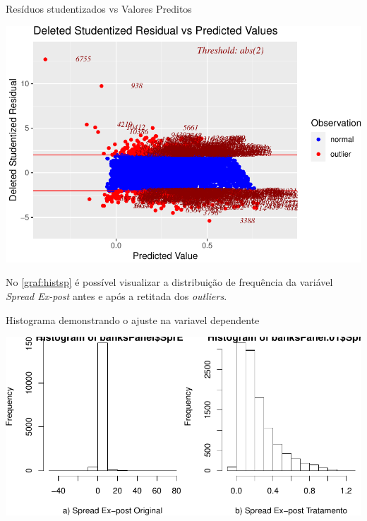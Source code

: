 \documentclass[
  12pt,
  12pt,
  openright,
  oneside,
  a4paper,
  chapter=TITLE,
  section=TITLE,
  subsection=TITLE,
  subsubsection=TITLE,
  english,
  portugues,
  sumario=tradicional]{abntex2}
\begin{document}
\begin{grafico}
\vspace{20pt}
\caption{Resíduos studentizados vs Valores Preditos}
\vspace{-4mm}

\begin{center}\includegraphics{12-exportedfigures/fit.01-1} \end{center}
\vspace{-3mm}
\label{graf:resstud}
\vspace{-2mm}
\end{grafico}

No \autoref{graf:histsp} é possível visualizar a distribuição de frequência da variável \emph{Spread Ex-post} antes e após a retitada dos \emph{outliers}.

\begin{grafico}[!hbtp]
\vspace{20pt}
\caption{Histograma demonstrando o ajuste na variavel dependente}
\vspace{-4mm}

\begin{center}\includegraphics[width=1\linewidth]{12-exportedfigures/hist.SprEp-1} \end{center}
\vspace{3mm}
\label{graf:histsp}
\vspace{-2mm}
\end{grafico}
\end{document}
